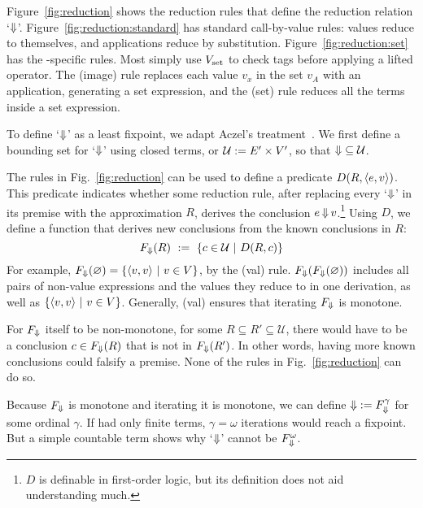 
Figure~\ref{fig:reduction} shows the reduction rules that define the reduction relation `$\operatorname{\Downarrow}$'. Figure~\ref{fig:reduction:standard} has standard call-by-value rules: values reduce to themselves, and applications reduce by substitution.
Figure~\ref{fig:reduction:set} has the \targetlang-specific rules. Most simply use $V_\mathrm{set}$ to check tags before applying a lifted operator.
The (image) rule replaces each value $v_x$ in the set $v_A$ with an application, generating a set expression, and the (set) rule reduces all the terms inside a set expression.

\newcommand{\Univ}{\mathcal{U}}

To define `$\operatorname{\Downarrow}$' as a least fixpoint, we adapt Aczel's treatment~\cite{cit:aczel-1977-inductive}. We first define a bounding set for `$\operatorname{\Downarrow}$' using closed terms, or $\Univ \metadef E' \times V'$, so that $\dto \subseteq \Univ$.

The rules in Fig.~\ref{fig:reduction} can be used to define a predicate $D(R,\langle{e,v}\rangle)$. This predicate indicates whether some reduction rule, after replacing every `$\operatorname{\Downarrow}$' in its premise with the approximation $R$, derives the conclusion $e \operatorname{\Downarrow} v$.\footnote{$D$ is definable in first-order logic, but its definition does not aid understanding much.}
Using $D$, we define a function that derives new conclusions from the known conclusions in $R$:
\begin{equation}
	F_{\dto}(R)\ \metadef\ \setb{c \in \Univ}{D(R,c)}
\end{equation}
For example, $F_{\operatorname{\Downarrow}}(\varnothing) = \lbrace {\langle{v,v}\rangle} \ \lvert\ {v \in V} \rbrace$, by the (val) rule. $F_{\operatorname{\Downarrow}}(F_{\operatorname{\Downarrow}}(\varnothing))$ includes all pairs of non-value expressions and the values they reduce to in one derivation, as well as $\lbrace {\langle{v,v}\rangle} \ \lvert\ {v \in V} \rbrace$. Generally, (val) ensures that iterating $F_{\operatorname{\Downarrow}}$ is monotone.

For $F_{\operatorname{\Downarrow}}$ itself to be non-monotone, for some $R \subseteq R' \subseteq \Univ$, there would have to be a conclusion $c \in F_{\operatorname{\Downarrow}}(R)$ that is not in $F_{\operatorname{\Downarrow}}(R')$. In other words, having more known conclusions could falsify a premise. None of the rules in Fig.~\ref{fig:reduction} can do so.

Because $F_{\operatorname{\Downarrow}}$ is monotone and iterating it is monotone, we can define $\operatorname{\Downarrow} := F_{\operatorname{\Downarrow}}^\gamma$ for some ordinal $\gamma$. If \targetlang had only finite terms, $\gamma = \omega$ iterations would reach a fixpoint. But a simple countable term shows why `$\operatorname{\Downarrow}$' cannot be $F_{\operatorname{\Downarrow}}^\omega$.


